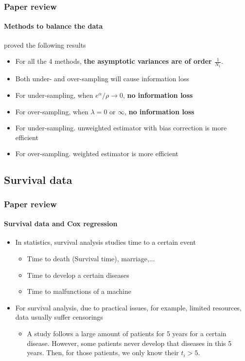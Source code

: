 \documentclass{beamer}
\newcommand{\red}{\color{red}}
\newcommand{\rhl}[1]{{\red \textbf{#1}}}
\begin{document}
    \begin{frame}
        \frametitle{Paper review}
        \framesubtitle{Methods to balance the data}
        \cite{wang2020logistic} proved the following results
        \begin{itemize}
            \item For all the 4 methods, \rhl{the asymptotic variances are of order $\frac{1}{N_1}$}.
            \item Both under- and over-sampling will cause information loss
            \item For under-sampling, when $e^\alpha/\rho\to 0$, \rhl{no information loss}
            \item For over-sampling, when $\lambda=0$ or $\infty$, \rhl{no information loss}
            \item For under-sampling. unweighted estimator with bias correction is more efficient
            \item For over-sampling. weighted estimator is more efficient
        \end{itemize}
    \end{frame}

    \subsection{Survival data}

    \begin{frame}
        \frametitle{Paper review}
        \framesubtitle{Survival data and Cox regression}
        \begin{itemize}
            \item In statistics, survival analysis studies time to a certain event
            \begin{itemize}
                \item Time to death (Survival time), marriage,...
                \item Time to develop a certain diseases
                \item Time to malfunctions of a machine
            \end{itemize}
            \item For survival analysis, due to practical issues, for example, limited resources, data usually suffer censorings
            \begin{itemize}
                \item A study follows a large amount of patients for 5 years for a certain disease. However, some patients never develop that diseases in this 5 years. Then, for those patients, we only know their $t_i>5$.
            \end{itemize}
        \end{itemize}
    \end{frame}
\end{document}

